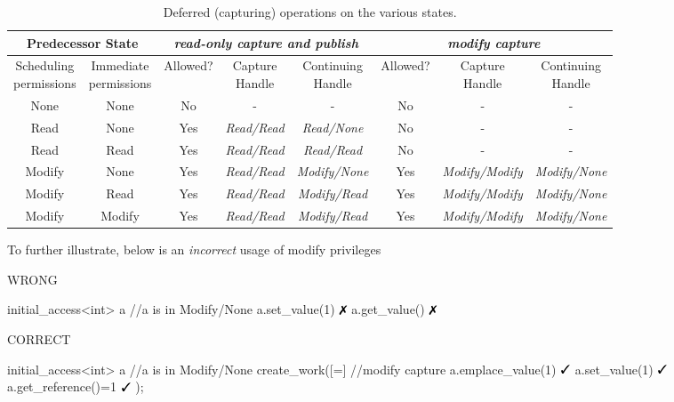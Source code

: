\begin{table}[!t]
\begin{center}
{\small
\begin{tabular}{cc|ccc|ccc}
 \hline
 \multicolumn{2}{c|}{Predecessor State} 
 & \multicolumn{3}{c|}{\em{read-only capture} and publish} 
 & \multicolumn{3}{c}{\em{modify capture}}  \\
 \hline
 \specialcell{Scheduling\\ permissions} 
 & \specialcell{Immediate\\ permissions}  
 & {\footnotesize Allowed? } &  \specialcell{\footnotesize Capture\\Handle} 
 &  \specialcell{\footnotesize Continuing\\Handle} 
 & {\footnotesize Allowed? } &  \specialcell{\footnotesize Capture\\Handle} 
 &  \specialcell{\footnotesize Continuing\\Handle} \\
 \hline
 None & None & No & - & - & No & - & - \\
 Read & None 
 & Yes 
 & {\em Read/Read}
 & {\em Read/None}
 & No
 & -
 & - \\
 Read & Read
 & Yes 
 & {\em Read/Read}
 & {\em Read/Read}
 & No
 & -
 & - \\
 Modify & None
 & Yes 
 & {\em Read/Read}
 & {\em Modify/None}
 & Yes
 & {\em Modify/Modify} 
 & {\em Modify/None} \\
 Modify & Read
 & Yes 
 & {\em Read/Read}
 & {\em Modify/Read}
 & Yes
 & {\em Modify/Modify} 
 & {\em Modify/None} \\
 Modify & Modify
 & Yes 
 & {\em Read/Read} 
 & {\em Modify/Read} 
 & Yes
 & {\em Modify/Modify}
 & {\em Modify/None} \\
\end{tabular}
}
\caption{Deferred (capturing) operations on the various states.}
\label{tab:capsimp}
\end{center}
\end{table}


To further illustrate, below is an \emph{incorrect} usage of modify privileges

\begin{minipage}[t]{0.45\linewidth}
\centering WRONG
\begin{vaspPseudo}
initial_access<int> a
//a is in Modify/None
a.set_value(1) $\no$ 
a.get_value()  $\no$
\end{vaspPseudo}
\end{minipage}
\begin{minipage}[t]{0.45\linewidth}
\centering CORRECT
\begin{vaspPseudo}
initial_access<int> a
//a is in Modify/None
create_work([=]{ //modify capture
    a.emplace_value(1)  $\yes$
    a.set_value(1)      $\yes$
    a.get_reference()=1 $\yes$
});
\end{vaspPseudo}
\end{minipage}


